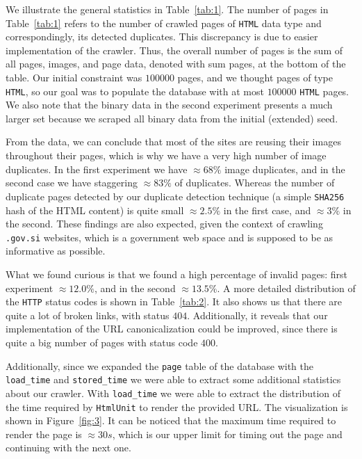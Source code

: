 \documentclass{article}
\begin{document}
We illustrate the general statistics in Table~\ref{tab:1}. The number of pages in Table~\ref{tab:1} refers to the number of crawled pages of \texttt{HTML} data type and correspondingly, its detected duplicates. This discrepancy is due to easier implementation of the crawler. Thus, the overall number of pages is the sum of all pages, images, and page data, denoted with sum pages, at the bottom of the table. Our initial constraint was $100000$ pages, and we thought pages of type \texttt{HTML}, so our goal was to populate the database with at most $100000$ \texttt{HTML} pages. We also note that the binary data in the second experiment presents a much larger set because we scraped all binary data from the initial (extended) seed.

From the data, we can conclude that most of the sites are reusing their images throughout their pages, which is why we have a very high number of image duplicates. In the first experiment we have $\approx68\%$ image duplicates, and in the second case we have staggering $\approx83\%$ of duplicates. Whereas the number of duplicate pages detected by our duplicate detection technique (a simple \texttt{SHA256} hash of the HTML content) is quite small $\approx2.5\%$ in the first case, and $\approx3\%$ in the second. These findings are also expected, given the context of crawling \texttt{.gov.si} websites, which is a government web space and is supposed to be as informative as possible.

What we found curious is that we found a high percentage of invalid pages: first experiment $\approx12.0\%$, and in the second $\approx13.5\%$. A more detailed distribution of the \texttt{HTTP} status codes is shown in Table~\ref{tab:2}. It also shows us that there are quite a lot of broken links, with status $404$. Additionally, it reveals that our implementation of the URL canonicalization could be improved, since there is quite a big number of pages with status code $400$.

Additionally, since we expanded the \texttt{page} table of the database with the \texttt{load\_time} and \texttt{stored\_time} we were able to extract some additional statistics about our crawler. With  \texttt{load\_time} we were able to extract the distribution of the time required by \texttt{HtmlUnit} to render the provided URL. The visualization is shown in Figure~\ref{fig:3}. It can be noticed that the maximum time required to render the page is $\approx30s$, which is our upper limit for timing out the page and continuing with the next one.
\end{document}
